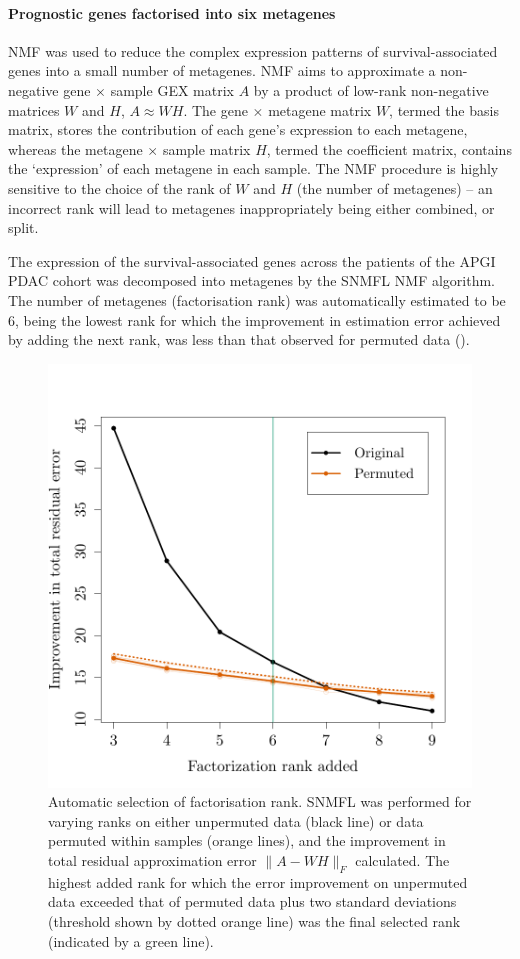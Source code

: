 \documentclass[dissertation.tex]{subfiles}
\begin{document}
\paragraph{Prognostic genes factorised into six metagenes}
\gls{NMF} was used to reduce the complex expression patterns of  survival-associated genes into a small number of metagenes.  \gls{NMF} aims to approximate a non-negative gene $\times$ sample \gls{GEX} matrix $A$ by a product of low-rank non-negative matrices $W$ and $H$, $A \approx W H$.  The gene $\times$ metagene matrix $W$, termed the basis matrix, stores the contribution of each gene's expression to each metagene, whereas the metagene $\times$ sample matrix $H$, termed the coefficient matrix, contains the `expression' of each metagene in each sample.  The \gls{NMF} procedure is highly sensitive to the choice of the rank of $W$ and $H$ (the number of metagenes) -- an incorrect rank will lead to metagenes inappropriately being either combined, or split.

The expression of the  survival-associated genes across the  patients of the \gls{APGI} \gls{PDAC} cohort was decomposed into metagenes by the \gls{SNMFL} \gls{NMF} algorithm.  The number of metagenes (factorisation rank) was automatically estimated to be 6, being the lowest rank for which the improvement in estimation error achieved by adding the next rank, was less than that observed for permuted data ().

\begin{figure}[!htbp]
\centering
\includegraphics[width=.7\linewidth]{analysis/biosurv/reports/18_SIS_diag_dsd_final/figure/nmf-rank-plots-2}
\caption[Automatic selection of \texorpdfstring{\acrshort{NMF}}{NMF} factorisation rank]{Automatic selection of factorisation rank.  \acrshort{SNMFL} was performed for varying ranks on either unpermuted data (black line) or data permuted within samples (orange lines), and the improvement in total residual approximation error $\|A - W H\|_F$ calculated.  The highest added rank for which the error improvement on unpermuted data exceeded that of permuted data plus two standard deviations (threshold shown by dotted orange line) was the final selected rank (indicated by a green line).}\label{fig:sigs-nmf-rank}
\end{figure}
\end{document}
